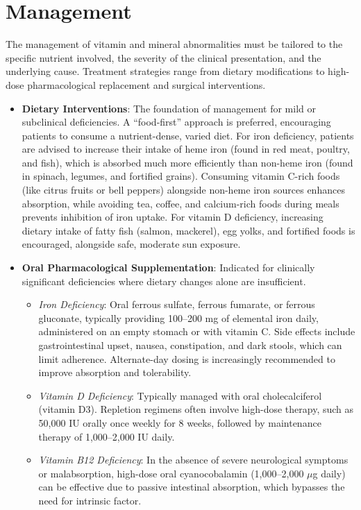 \section*{Management}
The management of vitamin and mineral abnormalities must be tailored to the specific nutrient involved, the severity of the clinical presentation, and the underlying cause. Treatment strategies range from dietary modifications to high-dose pharmacological replacement and surgical interventions.
\begin{itemize}
\item \textbf{Dietary Interventions}: The foundation of management for mild or subclinical deficiencies. A ``food-first'' approach is preferred, encouraging patients to consume a nutrient-dense, varied diet. For iron deficiency, patients are advised to increase their intake of heme iron (found in red meat, poultry, and fish), which is absorbed much more efficiently than non-heme iron (found in spinach, legumes, and fortified grains). Consuming vitamin C-rich foods (like citrus fruits or bell peppers) alongside non-heme iron sources enhances absorption, while avoiding tea, coffee, and calcium-rich foods during meals prevents inhibition of iron uptake. For vitamin D deficiency, increasing dietary intake of fatty fish (salmon, mackerel), egg yolks, and fortified foods is encouraged, alongside safe, moderate sun exposure.
\item \textbf{Oral Pharmacological Supplementation}: Indicated for clinically significant deficiencies where dietary changes alone are insufficient.
  \begin{itemize}
  \item \textit{Iron Deficiency}: Oral ferrous sulfate, ferrous fumarate, or ferrous gluconate, typically providing 100--200 mg of elemental iron daily, administered on an empty stomach or with vitamin C. Side effects include gastrointestinal upset, nausea, constipation, and dark stools, which can limit adherence. Alternate-day dosing is increasingly recommended to improve absorption and tolerability.
  \item \textit{Vitamin D Deficiency}: Typically managed with oral cholecalciferol (vitamin D3). Repletion regimens often involve high-dose therapy, such as 50,000 IU orally once weekly for 8 weeks, followed by maintenance therapy of 1,000--2,000 IU daily.
  \item \textit{Vitamin B12 Deficiency}: In the absence of severe neurological symptoms or malabsorption, high-dose oral cyanocobalamin (1,000--2,000 $\mu$g daily) can be effective due to passive intestinal absorption, which bypasses the need for intrinsic factor.

\end{itemize}
\end{itemize}
